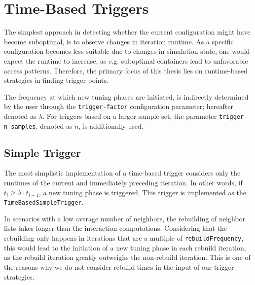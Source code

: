 \section{Time-Based Triggers}
\label{sec:time_base_triggers}
The simplest approach in detecting whether the current configuration might have become suboptimal, is to observe changes in iteration runtime. As a specific configuration becomes less suitable due to changes in simulation state, one would expect the runtime to increase, as e.g. suboptimal containers lead to unfavorable access patterns. Therefore, the primary focus of this thesis lies on runtime-based strategies in finding trigger points.

The frequency at which new tuning phases are initiated, is indirectly determined by the user through the \texttt{trigger-factor} configuration parameter; hereafter denoted as $\lambda$. For triggers based on a larger sample set, the parameter \texttt{trigger-n-samples}, denoted as $n$, is additionally used.

\subsection{Simple Trigger}
\label{subsec:simple_trigger}
The most simplistic implementation of a time-based trigger considers only the runtimes of the current and immediately preceding iteration. In other words, if $t_i \ge \lambda\cdot t_{i-1}$, a new tuning phase is triggered. This trigger is implemented as the \texttt{TimeBasedSimpleTrigger}.

In scenarios with a low average number of neighbors, the rebuilding of neighbor lists takes longer than the interaction computations. Considering that the rebuilding only happens in iterations that are a multiple of \texttt{rebuildFrequency}, this would lead to the initiation of a new tuning phase in each rebuild iteration, as the rebuild iteration greatly outweighs the non-rebuild iteration. This is one of the reasons why we do not consider rebuild times in the input of our trigger strategies.


